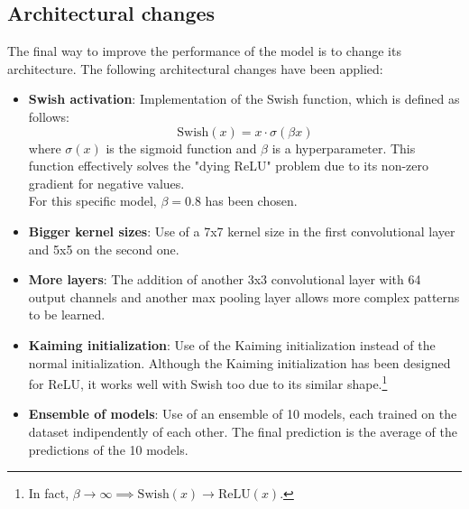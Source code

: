 \documentclass[a4paper, 11pt]{article}
\begin{document}
\subsection{Architectural changes}
The final way to improve the performance of the model is to change its architecture.
The following architectural changes have been applied:
\begin{itemize}
    \item \textbf{Swish activation}: Implementation of the Swish function, which is defined as follows:
    \begin{equation*}
        \text{Swish}(x) = x \cdot \sigma (\beta x)
    \end{equation*}
    where $\sigma(x)$ is the sigmoid function and $\beta$ is a hyperparameter. This function effectively solves the "dying ReLU" problem due to its non-zero gradient for negative values. \cite{ramachandran2017searching}\\
    For this specific model, $\beta = 0.8$ has been chosen.
    \item \textbf{Bigger kernel sizes}: Use of a 7x7 kernel size in the first convolutional layer and 5x5 on the second one.
    \item \textbf{More layers}: The addition of another 3x3 convolutional layer with 64 output channels and another max pooling layer allows more complex patterns to be learned.
    \item \textbf{Kaiming initialization}: Use of the Kaiming initialization \cite{he2015delving} instead of the normal initialization. 
    Although the Kaiming initialization has been designed for ReLU, it works well with Swish too due to its similar shape.\footnote{In fact, $\beta \rightarrow \infty \implies \text{Swish}(x) \rightarrow \text{ReLU}(x)$.}
    \item \textbf{Ensemble of models}: Use of an ensemble of 10 models, each trained on the dataset indipendently of each other.
    The final prediction is the average of the predictions of the 10 models. \cite{szegedy2015going}
\end{itemize}

\pagebreak
\end{document}
